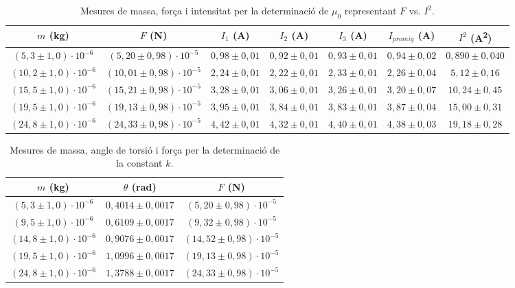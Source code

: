 \documentclass[a4paper,10.5pt]{report}
\begin{document}
\begin{appendices}
\begin{table}[h]
	\centering
	\small %
	\renewcommand{\arraystretch}{1.2}
	\caption{Mesures de massa, força i intensitat per la determinació de $\mu_0$ representant $F$ vs. $I^2$.}
	\begin{tabular}{ccccccc}
		\toprule
		$m$ (kg) & $F$ (N) & $I_1$ (A) & $I_2$ (A) & $I_3$ (A) & $I_{promig}$ (A) & $I^2$ (A\textsuperscript{2}) \\
		\midrule
		\((5,3 \pm 1,0) \cdot 10^{-6}\) & \((5,20 \pm 0,98) \cdot 10^{-5}\) & \(0,98 \pm 0,01\) & \(0,92 \pm 0,01\) & \(0,93 \pm 0,01\) & \(0,94 \pm 0,02\) & \(0,890 \pm 0,040\) \\
		\((10,2 \pm 1,0) \cdot 10^{-6}\) & \((10,01 \pm 0,98) \cdot 10^{-5}\) & \(2,24 \pm 0,01\) & \(2,22 \pm 0,01\) & \(2,33 \pm 0,01\) & \(2,26 \pm 0,04\) & \(5,12 \pm 0,16\) \\
		\((15,5 \pm 1,0) \cdot 10^{-6}\) & \((15,21 \pm 0,98) \cdot 10^{-5}\) & \(3,28 \pm 0,01\) & \(3,06 \pm 0,01\) & \(3,26 \pm 0,01\) & \(3,20 \pm 0,07\) & \(10,24 \pm 0,45\) \\
		\((19,5 \pm 1,0) \cdot 10^{-6}\) & \((19,13 \pm 0,98) \cdot 10^{-5}\) & \(3,95 \pm 0,01\) & \(3,84 \pm 0,01\) & \(3,83 \pm 0,01\) & \(3,87 \pm 0,04\) & \(15,00 \pm 0,31\) \\
		\((24,8 \pm 1,0) \cdot 10^{-6}\) & \((24,33 \pm 0,98) \cdot 10^{-5}\) & \(4,42 \pm 0,01\) & \(4,32 \pm 0,01\) & \(4,40 \pm 0,01\) & \(4,38 \pm 0,03\) & \(19,18 \pm 0,28\) \\
		\bottomrule
	\end{tabular}
\end{table}

\begin{table}[h]
	\centering
	\small
	\renewcommand{\arraystretch}{1.2}
	\caption{Mesures de massa, angle de torsió i força per la determinació de la constant $k$.}
	\begin{tabular}{ccc}
		\toprule
		$m$ (kg) & $\theta$ (rad) & $F$ (N) \\
		\midrule
		\((5,3 \pm 1,0) \cdot 10^{-6}\) & \(0,4014 \pm 0,0017\) & \((5,20 \pm 0,98) \cdot 10^{-5}\) \\
		\((9,5 \pm 1,0) \cdot 10^{-6}\) & \(0,6109 \pm 0,0017\) & \((9,32 \pm 0,98) \cdot 10^{-5}\) \\
		\((14,8 \pm 1,0) \cdot 10^{-6}\) & \(0,9076 \pm 0,0017\) & \((14,52 \pm 0,98) \cdot 10^{-5}\) \\
		\((19,5 \pm 1,0) \cdot 10^{-6}\) & \(1,0996 \pm 0,0017\) & \((19,13 \pm 0,98) \cdot 10^{-5}\) \\
		\((24,8 \pm 1,0) \cdot 10^{-6}\) & \(1,3788 \pm 0,0017\) & \((24,33 \pm 0,98) \cdot 10^{-5}\) \\
		\bottomrule
	\end{tabular}
	\label{tab:taula_massa_angle_forca}
\end{table}


\end{appendices}
\end{document}
